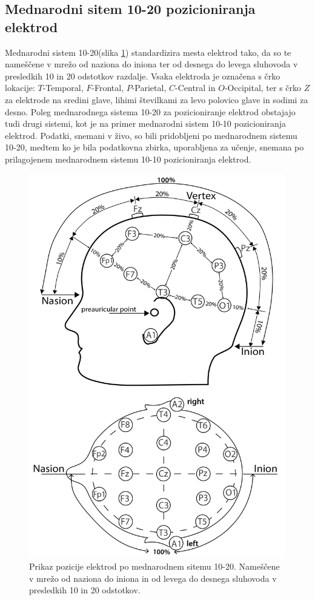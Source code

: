 \subsection{Mednarodni sitem 10-20 pozicioniranja elektrod}
Mednarodni sistem 10-20(slika \ref{slika:mednarodni_sistem_20}) standardizira mesta elektrod tako, da so te  nameščene v mrežo od naziona do iniona ter od desnega do levega sluhovoda v presledkih 10 in 20 odstotkov razdalje. Vsaka elektroda je označena s črko lokacije: $T$-Temporal, $F$-Frontal, $P$-Parietal, $C$-Central in $O$-Occipital, ter s črko $Z$ za elektrode na sredini glave, lihimi številkami za levo polovico glave in sodimi za desno. \cite{klemTentwentyElectrodeSystem1999} Poleg mednarodnega sistema 10-20 za pozicioniranje elektrod obstajajo tudi drugi sistemi, kot je na primer mednarodni sistem 10-10 pozicioniranja elektrod. Podatki, snemani v živo, so bili pridobljeni po mednarodnem sistemu 10-20, medtem ko je bila podatkovna zbirka, uporabljena za učenje, snemana po prilagojenem mednarodnem sistemu 10-10 pozicioniranja elektrod.
\begin{figure}[h]
    \begin{center}
    \includegraphics[width=0.5\linewidth]{slike/1020-diagram1.jpg}
    \end{center}
    \caption[Mednarodni sitem 10-20 pozicioniranja elektrod.]{Prikaz pozicije elektrod po mednarodnem sitemu 10-20. Nameščene v mrežo od naziona do iniona in od levega do desnega sluhovoda v presledkih 10 in 20 odstotkov. \cite{ElectrodeArrangementAccording}}
    \label{slika:mednarodni_sistem_20}
    \end{figure}

